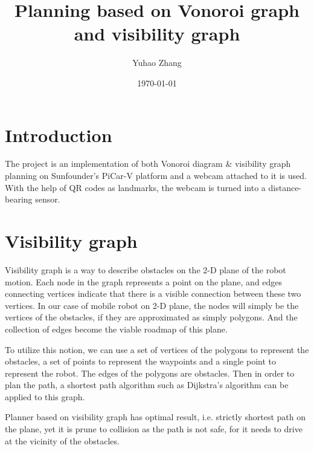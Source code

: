 \documentclass[12pt]{article}
\title{Planning based on Vonoroi graph and visibility graph}
\author{Yuhao Zhang}
\date{\today}
\begin{document}
\maketitle


%
\section{Introduction}
The project is an implementation of both Vonoroi diagram \& visibility graph planning on Sunfounder's PiCar-V platform and a webcam attached to it is used. With the help of QR codes as landmarks, the webcam is turned into a distance-bearing sensor.
\section{Visibility graph}
\label{Visibility}
Visibility graph is a way to describe obstacles on the 2-D plane of the robot motion. Each node in the graph represents a point on the plane, and edges connecting vertices indicate that there is a visible connection between these two vertices. In our case of mobile robot on 2-D plane, the nodes will simply be the vertices of the obstacles, if they are approximated as simply polygons. And the collection of edges become the viable roadmap of this plane. 

To utilize this notion, we can use a set of vertices of the polygons to represent the obstacles, a set of points to represent the waypoints and a single point to represent the robot. The edges of the polygons are obstacles. Then in order to plan the path, a shortest path algorithm such as Dijkstra's algorithm can be applied to this graph. 

Planner based on visibility graph has optimal result, i.e. strictly shortest path on the plane, yet it is prune to collision as the path is not safe, for it needs to drive at the vicinity of the obstacles.
\end{document}
